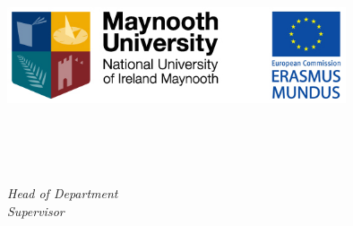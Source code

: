 
\begin{titlepage}

\begin{addmargin}[-1cm]{-3cm}
\begin{center}
\large

\hfill
\vfill

\begingroup
\color{Maroon}\spacedallcaps{\myTitle} \\ \bigskip %
\endgroup

\spacedlowsmallcaps{\myName} %

\vspace*{14ex}

\includegraphics[width=10cm]{gfx/mu_em} \\

\vspace*{8ex}

\mySubtitle \\ \medskip %
\myDegree \\
\myDepartment \\
\myUni

\bigskip

\emph{Head of Department} \mySupervisor \\
\emph{Supervisor} \mySupervisor


\vfill


\end{center}
\end{addmargin}

\end{titlepage}

